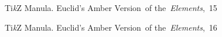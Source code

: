 \documentclass[a4paper,11pt]{article}
\begin{document}
\begin{figure}[ht]

  \centering

  \begin{tikzpicture}





















  \end{tikzpicture}

  \caption{Ti\textit{k}Z Manula. Euclid's Amber Version~of
    the~\textit{Elements},~15}

\end{figure}





\begin{figure}[ht]

  \centering

  \begin{tikzpicture}




























  \end{tikzpicture}

  \caption{Ti\textit{k}Z Manula. Euclid's Amber Version~of
    the~\textit{Elements},~16}

\end{figure}
\end{document}
